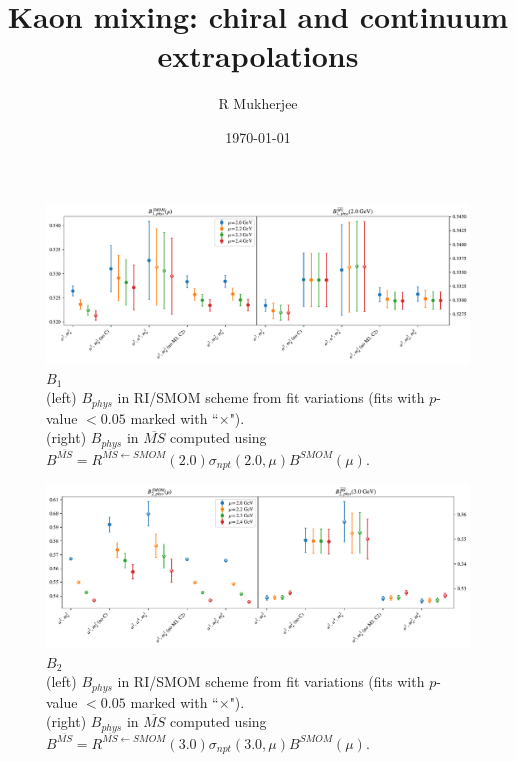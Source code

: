 \documentclass[12pt]{extarticle}
\title{Kaon mixing: chiral and continuum extrapolations}
\author{R Mukherjee}
\date{\today}
\begin{document}
\maketitle
\tableofcontents
\clearpage
\begin{figure}
\centering
\includegraphics[page=1, width=1.1\textwidth]{VVpAA/SUSY/fit_summary.pdf}
\caption{$B_{1}$\\(left) $B_{phys}$ in RI/SMOM scheme from fit variations (fits with $p$-value $<0.05$ marked with ``$\times$"). \\(right) $B_{phys}$ in $\overline{MS}$ computed using $B^{\overline{MS}} = R^{\overline{MS}\leftarrow SMOM}(2.0)\sigma_{npt}(2.0,\mu) B^{SMOM}(\mu)$.}
\end{figure}
\clearpage
\begin{figure}
\centering
\includegraphics[page=1, width=1.1\textwidth]{VVmAA/SUSY/fit_summary.pdf}
\caption{$B_{2}$\\(left) $B_{phys}$ in RI/SMOM scheme from fit variations (fits with $p$-value $<0.05$ marked with ``$\times$"). \\(right) $B_{phys}$ in $\overline{MS}$ computed using $B^{\overline{MS}} = R^{\overline{MS}\leftarrow SMOM}(3.0)\sigma_{npt}(3.0,\mu) B^{SMOM}(\mu)$.}
\end{figure}
\clearpage
\end{document}
